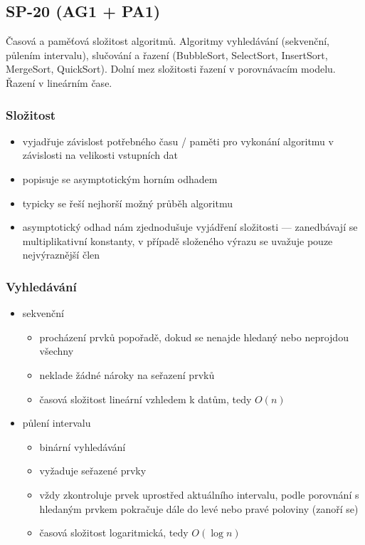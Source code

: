 \subsection{SP-20 (AG1 + PA1)}
Časová a paměťová složitost algoritmů. Algoritmy vyhledávání (sekvenční, půlením intervalu), slučování a řazení (BubbleSort, SelectSort, InsertSort, MergeSort, QuickSort). Dolní mez složitosti řazení v porovnávacím modelu. Řazení v lineárním čase.

\subsubsection*{Složitost}
\begin{itemize}
	\item vyjadřuje závislost potřebného času / paměti pro vykonání algoritmu v závislosti na velikosti vstupních dat
	\item popisuje se asymptotickým horním odhadem
	\item typicky se řeší nejhorší možný průběh algoritmu
	\item asymptotický odhad nám zjednodušuje vyjádření složitosti --- zanedbávají se multiplikativní konstanty, v případě složeného výrazu se uvažuje pouze nejvýraznější člen
\end{itemize}

\subsubsection*{Vyhledávání}
\begin{itemize}
	\item sekvenční
	\begin{itemize}
		\item procházení prvků popořadě, dokud se nenajde hledaný nebo neprojdou všechny
		\item neklade žádné nároky na seřazení prvků
		\item časová složitost lineární vzhledem k datům, tedy $O(n)$
	\end{itemize}
	\item půlení intervalu
	\begin{itemize}
		\item binární vyhledávání
		\item vyžaduje seřazené prvky
		\item vždy zkontroluje prvek uprostřed aktuálního intervalu, podle porovnání s hledaným prvkem pokračuje dále do levé nebo pravé poloviny (zanoří se)
		\item časová složitost logaritmická, tedy $O(\log n)$ 
	\end{itemize}
\end{itemize}

